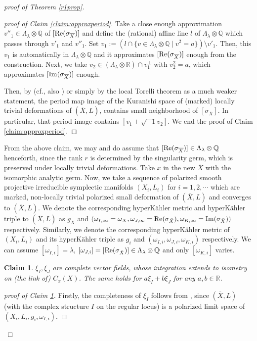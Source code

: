 \documentclass[12pt,a4paper]{amsart}
\newtheorem{Claim}[Thm]{Claim}
\theoremstyle{remark}
\theoremstyle{definition}
\def\R{\mathbb{R}}
\def\Q{\mathbb{Q}}
\begin{document}
\begin{proof}[proof of Theorem \ref{r1prop}]
\begin{proof}[proof of Claim \ref{claim:approxperiod}]
 
Take a close enough approximation 
$v''_1\in \Lambda_\lambda\otimes \Q$ 
of $[{\rm Re}(\sigma_{\overline{X}})]$ and define the 
(rational) affine 
line $l$ of $\Lambda_\lambda\otimes \Q$ 
which passes through $v'_1$ and $v''_1$. 
Set $v_1:=(l\cap 
\{v\in \Lambda_\lambda\otimes \Q\mid v^2=a\})\setminus v'_1$. 
Then, this $v_1$ is 
automatically in $\Lambda_\lambda\otimes \Q$ 
and it approximates $[{\rm Re}(\sigma_{\overline{X}})]$ enough 
from the construction. 
Next, we take $v_2\in (\Lambda_\lambda\otimes \R)\cap 
v_1^\perp$ with $v_2^2=a$, 
which approximates $[{\rm Im}(\sigma_{\overline{X}})]$ enough. 

Then, 
by \cite[1.3]{BakkerLehn} (cf., also 
\cite[\S 8.6]{BakkerLehn2}) or simply 
by the local Torelli theorem as 
a much weaker statement, 
the period map image of 
the Kuranishi space of (marked) 
locally trivial deformations of 
$(\overline{X},L)$, contains small neighborhood of 
$[\sigma_{\overline{X}}]$. In particular, that 
period image contains $[v_1+\sqrt{-1}v_2]$. 
We end the proof of Claim \ref{claim:approxperiod}. 
\end{proof}

From the above claim, we may and do assume that
$[{\rm Re}(\sigma_{\overline{X}})] \in \Lambda_\lambda \otimes \Q$ henceforth,
since the rank $r$ is determined by the singularity germ,
which is preserved under locally trivial deformations. 
Take $x$ in the new $\overline{X}$ with the isomorphic 
analytic germ. 
Now, we take a sequence 
of polarized smooth projective irreducible symplectic 
manifolds $(X_i,L_i)$ for $i=1,2,\cdots$ 
which are 
marked, non-locally trivial polarized small deformation 
of $(\overline{X},L)$ and converges to 
$(\overline{X},L)$. We denote the corresponding 
hyperK\"ahler metric and hyperK\"ahler triple 
to $(\overline{X},L)$ 
as $g_X$ and $(\omega_{I,\infty}=\omega_X, 
\omega_{J,\infty}={\rm Re}(\sigma_{\bar X}), \omega_{K,\infty}={\rm Im}(\sigma_{\bar X}))$ respectively. 
Similarly, we denote the corresponding hyperK\"ahler metric of 
$(X_i,L_i)$ and its hyperK\"ahler triple as 
$g_i$ and $(\omega_{I,i},\omega_{J,i},\omega_{K,i})$ 
respectively. We can assume $[\omega_{I,i}]=\lambda$, 
$[\omega_{J,i}]=[{\rm Re}(\sigma_{\bar X})]\in 
\Lambda_\lambda\otimes \Q$ and only $[\omega_{K,i}]$ 
varies. 

\begin{Claim}\label{claim:completevf12}
$\xi_I, \xi_J$ are complete vector fields, 
whose integration extends to isometry on (the link of) 
$C_x(X)$. The same holds for 
$a\xi_I+b\xi_J$ for any $a,b\in \R$. 
\end{Claim}
\begin{proof}[proof of Claim \ref{claim:completevf12}] 
Firstly, the completeness of $\xi_I$ follows from 
\cite[Lemma 2.17]{DSII}, since 
$(\overline{X},L)$ (with the complex structure $I$ on 
the regular locus) is a polarized limit space of 
$(X_i,L_i,g_i,\omega_{I,i})$. 


\end{proof}
\end{proof}
\end{document}
